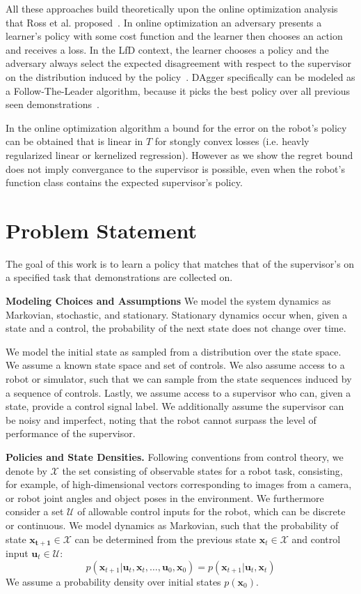 \documentclass[10pt, conference]{ieeeconf}      %
\newcommand{\bu}{\mathbf{u}}
\newcommand{\bx}{\mathbf{x}}
\begin{document}
All these approaches build theoretically upon the online optimization analysis that Ross et al. proposed~\cite{ross2010reduction}. In online optimization an adversary presents a learner's policy with some cost function and the learner then chooses an action and receives a loss. In the LfD context, the learner chooses a policy and the adversary always select the expected disagreement with respect to the supervisor on the distribution induced by the policy~\cite{shalev2011online}. DAgger specifically can be modeled as a Follow-The-Leader algorithm, because it picks the best policy over all previous seen demonstrations~\cite{ross2010reduction}.

In the online optimization algorithm a bound for the error on the robot's policy can be obtained that is linear in $T$ for stongly convex losses (i.e. heavly regularized linear or kernelized regression). However as we show the regret bound does not imply convergance to the supervisor is possible, even when the robot's function class contains the expected supervisor's policy. 


\section{Problem Statement}\label{sec:PS}
The goal of this work is to learn a policy that matches that of the supervisor's on a specified task that demonstrations are collected on. 

\noindent\textbf{Modeling Choices and Assumptions}  We model the system dynamics as Markovian, stochastic, and stationary. Stationary dynamics occur when, given a state and a control, the probability of the next state does not change over time. 

We model the initial state as sampled from a distribution over the state space.
We assume a known state space and set of controls. We also assume access to a robot or simulator, such that we  can sample from the state sequences induced by a sequence of controls.   Lastly, we assume access to a supervisor who can, given a state, provide a control signal label. We additionally assume the supervisor can be noisy and imperfect, noting that the robot cannot surpass the level of performance of the supervisor. 

\noindent\textbf{Policies and State Densities.}
Following conventions from control theory, we denote by $\mathcal{X}$ the set consisting of observable states for a robot task, consisting, for example, of 
high-dimensional vectors corresponding to images from a camera, or robot joint angles and object poses in the environment.
We furthermore consider a set $\mathcal{U}$ of allowable control inputs for the robot, which can be discrete or
continuous. We model dynamics as Markovian, such that the probability of state $\mathbf{x_{t+1}}\in
\mathcal{X}$ can be determined from the previous state $\mathbf{x}_t\in\mathcal{X}$ and control input $\mathbf{u}_t\in
\mathcal{U}$: 
$$p(\bx_{t+1}|\bu_{t},\bx_{t}, \ldots, \bu_{0}, \bx_{0})=p(\bx_{t+1}|\bu_{t}, \bx_t)$$
We assume a probability density over initial states $p(\bx_0)$.
\end{document}

